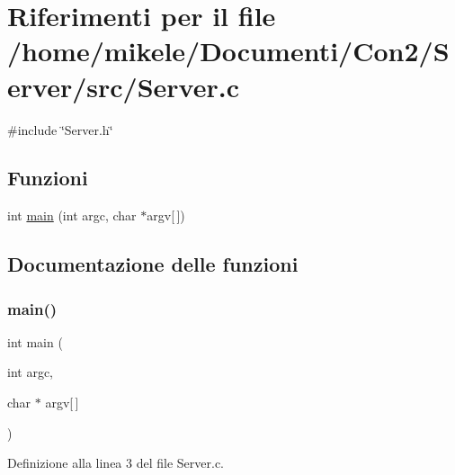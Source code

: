 \hypertarget{a00047}{}\section{Riferimenti per il file /home/mikele/\+Documenti/\+Con2/\+Server/src/\+Server.c}
\label{a00047}
{\ttfamily \#include \char`\"{}Server.\+h\char`\"{}}\newline
\subsection*{Funzioni}
\begin{DoxyCompactItemize}
\item 
int \mbox{\hyperlink{a00047_a0ddf1224851353fc92bfbff6f499fa97}{main}} (int argc, char $\ast$argv\mbox{[}$\,$\mbox{]})
\end{DoxyCompactItemize}


\subsection{Documentazione delle funzioni}
\mbox{\label{a00047_a0ddf1224851353fc92bfbff6f499fa97}} 
\subsubsection{\texorpdfstring{main()}{main()}}
{\footnotesize\ttfamily int main (\begin{DoxyParamCaption}\item[{int}]{argc,  }\item[{char $\ast$}]{argv\mbox{[}$\,$\mbox{]} }\end{DoxyParamCaption})}



Definizione alla linea 3 del file Server.\+c.


